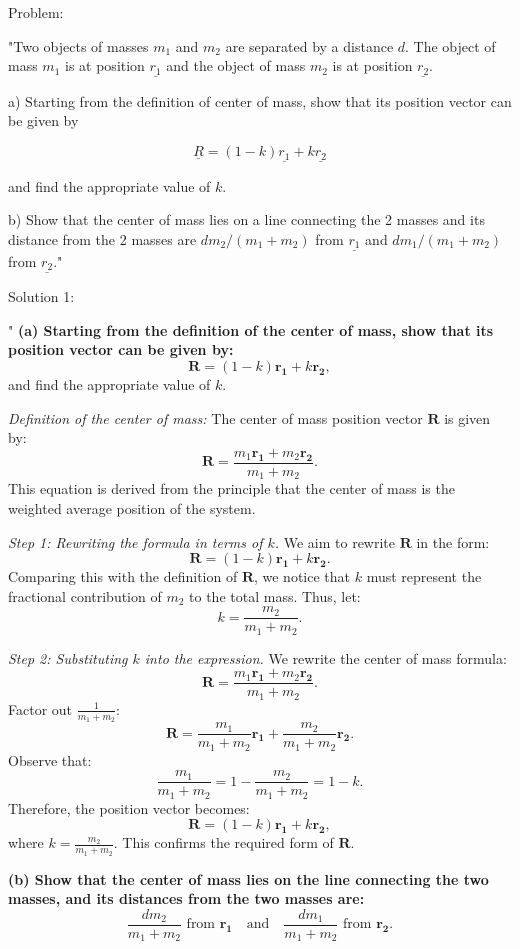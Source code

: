 Problem: 

"Two objects of masses \( m_{1} \) and \( m_{2} \) are separated by a distance \( d \). The object of mass \( m_{1} \) is at position \( \underline{r_{1}} \) and the object of mass \( m_{2} \) is at position \( \underline{r_{2}} \).

a) Starting from the definition of center of mass, show that its position vector can be given by 

\[ \underline{R} = (1-k)\underline{r_{1}} + k\underline{r_{2}} \]

and find the appropriate value of \( k \). 

b) Show that the center of mass lies on a line connecting the 2 masses and its distance from the 2 masses are \( d m_{2}/(m_{1}+m_{2}) \) from \( \underline{r_{1}} \) and \( d m_{1}/(m_{1}+m_{2}) \) from \( \underline{r_{2}} \)."

Solution 1:

"
\textbf{(a) Starting from the definition of the center of mass, show that its position vector can be given by:}
\[
\mathbf{R} = (1 - k)\mathbf{r_1} + k\mathbf{r_2},
\]
and find the appropriate value of $k$.

\textit{Definition of the center of mass:}
The center of mass position vector $\mathbf{R}$ is given by:
\[
\mathbf{R} = \frac{m_1 \mathbf{r_1} + m_2 \mathbf{r_2}}{m_1 + m_2}.
\]
This equation is derived from the principle that the center of mass is the weighted average position of the system.

\textit{Step 1: Rewriting the formula in terms of $k$.}  
We aim to rewrite $\mathbf{R}$ in the form:
\[
\mathbf{R} = (1 - k)\mathbf{r_1} + k\mathbf{r_2}.
\]
Comparing this with the definition of $\mathbf{R}$, we notice that $k$ must represent the fractional contribution of $m_2$ to the total mass. Thus, let:
\[
k = \frac{m_2}{m_1 + m_2}.
\]

\textit{Step 2: Substituting $k$ into the expression.}  
We rewrite the center of mass formula:
\[
\mathbf{R} = \frac{m_1 \mathbf{r_1} + m_2 \mathbf{r_2}}{m_1 + m_2}.
\]
Factor out $\frac{1}{m_1 + m_2}$:
\[
\mathbf{R} = \frac{m_1}{m_1 + m_2} \mathbf{r_1} + \frac{m_2}{m_1 + m_2} \mathbf{r_2}.
\]
Observe that:
\[
\frac{m_1}{m_1 + m_2} = 1 - \frac{m_2}{m_1 + m_2} = 1 - k.
\]
Therefore, the position vector becomes:
\[
\mathbf{R} = (1 - k)\mathbf{r_1} + k\mathbf{r_2},
\]
where $k = \frac{m_2}{m_1 + m_2}$. This confirms the required form of $\mathbf{R}$.

\vspace{0.5cm}
\textbf{(b) Show that the center of mass lies on the line connecting the two masses, and its distances from the two masses are:}
\[
\frac{d m_2}{m_1 + m_2} \text{ from } \mathbf{r_1} \quad \text{and} \quad \frac{d m_1}{m_1 + m_2} \text{ from } \mathbf{r_2}.
\]


